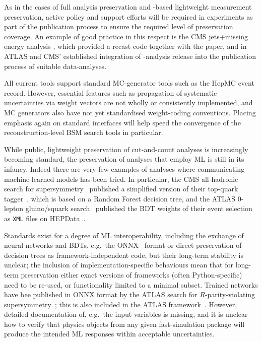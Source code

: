 \documentclass[11pt]{article}
\begin{document}
As in the cases of full analysis preservation and \rivet-based lightweight measurement preservation, active policy and support efforts will be required in experiments as part of the publication process to ensure the required level of preservation coverage. An example of good practice in this respect is the \gls{CMS} jets+missing energy analysis \cite{CMS:2021far}, which provided a \madanalysis recast code \cite{Albert:2774586,DVN/IRF7ZL_2021} together with the paper, and in \gls{ATLAS} and \gls{CMS}' established integration of \rivet-analysis release into the publication process of suitable data-analyses.

All current tools support standard MC-generator tools such as the HepMC event record. However, essential features such as propagation of systematic uncertainties via weight vectors are not wholly or consistently implemented, and MC generators also have not yet standardised weight-coding conventions. Placing emphasis again on standard interfaces will help speed the convergence of the reconstruction-level \gls{BSM} search tools in particular.

While public, lightweight preservation of cut-and-count analyses is increasingly becoming standard, the preservation of analyses that employ \gls{ML} is still in its infancy.
Indeed there are very few examples of analyses where communicating machine-learned models has been tried. In particular, the \gls{CMS} all-hadronic search for supersymmetry~\cite{CMS:2017qxu} published a simplified version of their top-quark tagger~\cite{cms:toptagger}, which is based on a Random Forest decision tree, and the \gls{ATLAS} 0-lepton gluino/squark search~\cite{ATLAS:2020syg,Uno:2763449} published the \gls{BDT} weights of their event selection as \texttt{XML} files on HEPData~\cite{hepdata.95664.v2/r8}.

Standards exist for a degree of \gls{ML} interoperability, including the exchange of neural networks and \glspl{BDT}, e.g.~the
\gls{ONNX}~\cite{onnx} format or direct preservation of decision trees as framework-independent code, but their long-term stability is unclear; the inclusion of implementation-specific behaviours mean that for long-term preservation either exact versions of frameworks (often Python-specific) need to be re-used, or functionality limited to a minimal subset. Trained networks have bee published in \gls{ONNX} format by the \gls{ATLAS} search for $R$-parity-violating supersymmetry~\cite{ATLAS:2021fbt,hepdata.104860.v1/r3}; this is also included in the \gls{ATLAS} \simpleanalysis framework~\cite{atlas:simpleanalysis}.
However, detailed documentation of, e.g.~the input variables is missing, and it is unclear how to verify that physics objects from any given fast-simulation package will produce the intended \gls{ML} responses within acceptable uncertainties.
\end{document}
